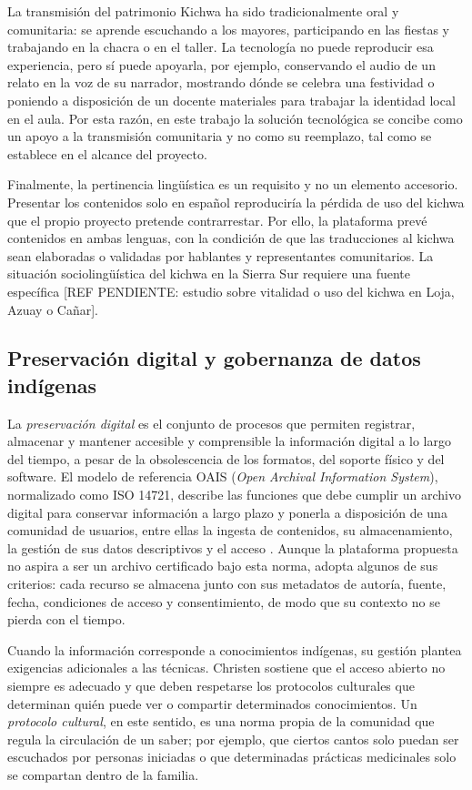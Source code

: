La transmisión del patrimonio Kichwa ha sido tradicionalmente oral y comunitaria: se aprende escuchando a los mayores, participando en las fiestas y trabajando en la chacra o en el taller. La tecnología no puede reproducir esa experiencia, pero sí puede apoyarla, por ejemplo, conservando el audio de un relato en la voz de su narrador, mostrando dónde se celebra una festividad o poniendo a disposición de un docente materiales para trabajar la identidad local en el aula. Por esta razón, en este trabajo la solución tecnológica se concibe como un apoyo a la transmisión comunitaria y no como su reemplazo, tal como se establece en el alcance del proyecto.

Finalmente, la pertinencia lingüística es un requisito y no un elemento accesorio. Presentar los contenidos solo en español reproduciría la pérdida de uso del kichwa que el propio proyecto pretende contrarrestar. Por ello, la plataforma prevé contenidos en ambas lenguas, con la condición de que las traducciones al kichwa sean elaboradas o validadas por hablantes y representantes comunitarios. La situación sociolingüística del kichwa en la Sierra Sur requiere una fuente específica [REF PENDIENTE: estudio sobre vitalidad o uso del kichwa en Loja, Azuay o Cañar].

\subsection{Preservación digital y gobernanza de datos indígenas}
La \textit{preservación digital} es el conjunto de procesos que permiten registrar, almacenar y mantener accesible y comprensible la información digital a lo largo del tiempo, a pesar de la obsolescencia de los formatos, del soporte físico y del software. El modelo de referencia OAIS (\textit{Open Archival Information System}), normalizado como ISO 14721, describe las funciones que debe cumplir un archivo digital para conservar información a largo plazo y ponerla a disposición de una comunidad de usuarios, entre ellas la ingesta de contenidos, su almacenamiento, la gestión de sus datos descriptivos y el acceso \cite{iso2025oais}. Aunque la plataforma propuesta no aspira a ser un archivo certificado bajo esta norma, adopta algunos de sus criterios: cada recurso se almacena junto con sus metadatos de autoría, fuente, fecha, condiciones de acceso y consentimiento, de modo que su contexto no se pierda con el tiempo.

Cuando la información corresponde a conocimientos indígenas, su gestión plantea exigencias adicionales a las técnicas. Christen \cite{christen2012information} sostiene que el acceso abierto no siempre es adecuado y que deben respetarse los protocolos culturales que determinan quién puede ver o compartir determinados conocimientos. Un \textit{protocolo cultural}, en este sentido, es una norma propia de la comunidad que regula la circulación de un saber; por ejemplo, que ciertos cantos solo puedan ser escuchados por personas iniciadas o que determinadas prácticas medicinales solo se compartan dentro de la familia.

